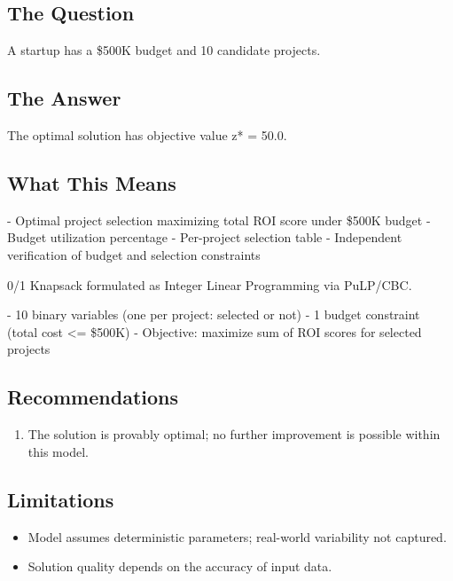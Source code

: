 \documentclass[11pt, a4paper]{article}
\begin{document}
\subsection{The Question}
A startup has a \$500K budget and 10 candidate projects.

\subsection{The Answer}

\begin{polyainsight}[title={Bottom Line}]
The optimal solution has objective value z* = 50.0.
\end{polyainsight}

\subsection{What This Means}

- Optimal project selection maximizing total ROI score under \$500K budget
- Budget utilization percentage
- Per-project selection table
- Independent verification of budget and selection constraints

0/1 Knapsack formulated as Integer Linear Programming via PuLP/CBC.

- 10 binary variables (one per project: selected or not)
- 1 budget constraint (total cost <= \$500K)
- Objective: maximize sum of ROI scores for selected projects



\subsection{Recommendations}

\begin{enumerate}
  \item The solution is provably optimal; no further improvement is possible within this model.
\end{enumerate}

\subsection{Limitations}

\begin{polyawarnbox}
\begin{itemize}
  \item Model assumes deterministic parameters; real-world variability not captured.
  \item Solution quality depends on the accuracy of input data.
\end{itemize}
\end{polyawarnbox}

\end{document}
